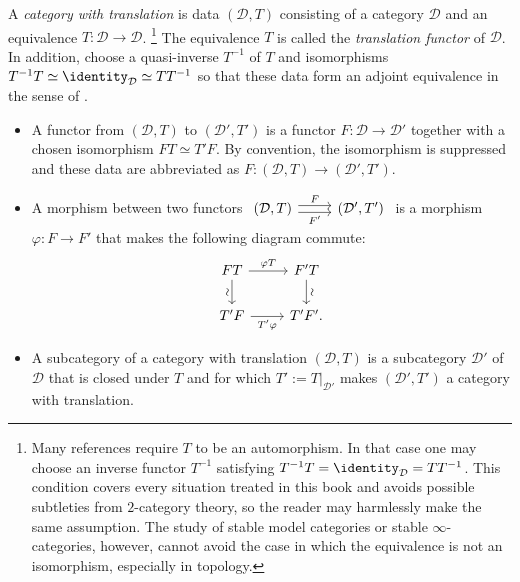 \begin{definition}\label{def:category-with-translation}
	A \emph{category with translation} is data $(\mathcal{D},T)$ consisting
	of a category $\mathcal{D}$ and an equivalence
	$T:\mathcal{D}\to\mathcal{D}$.%
	\footnote{Many references require $T$ to be an automorphism. In that case
	one may choose an inverse functor $T^{-1}$ satisfying
	$T^{-1}T=\identity_{\mathcal D}=TT^{-1}$. This condition covers every
	situation treated in this book and avoids possible subtleties from
	$2$-category theory, so the reader may harmlessly make the same
	assumption. The study of stable model categories or stable
	$\infty$-categories, however, cannot avoid the case in which the
	equivalence is not an isomorphism, especially in topology.}
	The equivalence $T$ is called the \emph{translation functor} of
	$\mathcal{D}$. In addition, choose a quasi-inverse $T^{-1}$ of $T$ and
	isomorphisms $T^{-1}T\simeq\identity_{\mathcal D}\simeq TT^{-1}$ so that
	these data form an adjoint equivalence in the sense of
	\cite[Theorem~2.6.12]{Li1}.

	\begin{itemize}
		\item A functor from $(\mathcal{D},T)$ to
		$(\mathcal{D}',T')$ is a functor $F:\mathcal{D}\to\mathcal{D}'$
		together with a chosen isomorphism $FT\simeq T'F$. By convention, the
		isomorphism is suppressed and these data are abbreviated as
		$F:(\mathcal{D},T)\to(\mathcal{D}',T')$.
		\item A morphism between two functors
		$\begin{tikzcd}
			(\mathcal{D},T) \arrow[r,shift left,"F"]
			\arrow[r,shift right,"{F'}"'] & (\mathcal{D}',T')
		\end{tikzcd}$
		is a morphism $\varphi:F\to F'$ that makes the following diagram
		commute:
		\[\begin{tikzcd}
			FT \arrow[r,"\varphi T"] \arrow[d,"\sim"' sloped] &
			F'T \arrow[d,"\sim" sloped] \\
			T'F \arrow[r,"{T'\varphi}"'] & T'F'.
		\end{tikzcd}\]
		\item A subcategory of a category with translation
		$(\mathcal{D},T)$ is a subcategory $\mathcal{D}'$ of $\mathcal{D}$
		that is closed under $T$ and for which
		$T':=T|_{\mathcal{D}'}$ makes $(\mathcal{D}',T')$ a category with
		translation.
	\end{itemize}


\end{definition}
